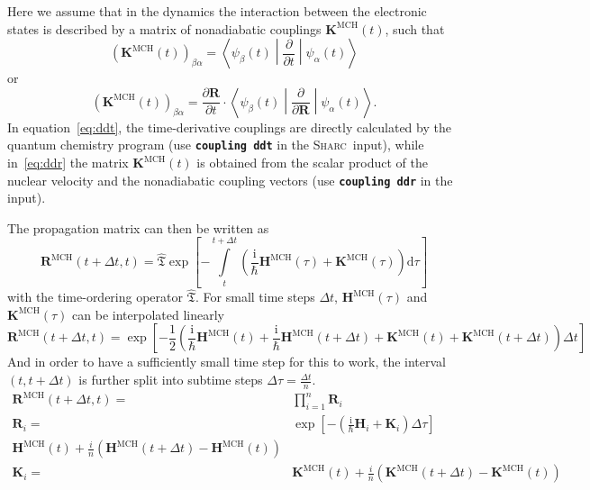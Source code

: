 \documentclass[a4paper,10pt,DIV=15,openany]{scrbook}
\newcommand{\sharc}{\textsc{Sharc}}
\newcommand{\ttt}[1]{\textbf{\texttt{#1}}}
\newcommand{\I}{\ensuremath{\mathrm{i}}}
\newcommand{\D}{\ensuremath{\mathrm{d}}}
\newcommand{\VEC}[1]{\ensuremath{\mathbf{#1}}}
\begin{document}
Here we assume that in the dynamics the interaction between the electronic states is described by a matrix of nonadiabatic couplings $\VEC{K}^{\text{MCH}}(t)$, such that
\begin{equation}
  \left(\VEC{K}^{\text{MCH}}(t)\right)_{\beta\alpha}
  =
  \left\langle
    \psi_\beta(t)
  \middle|
    \frac{\partial}{\partial t}
  \middle|
    \psi_\alpha(t)
  \right\rangle
  \label{eq:ddt}
\end{equation}
or
\begin{equation}
  \left(\VEC{K}^{\text{MCH}}(t)\right)_{\beta\alpha}
  =
  \frac{\partial \VEC{R}}{\partial t}\cdot
  \left\langle
    \psi_\beta(t)
  \middle|
    \frac{\partial}{\partial \VEC{R}}
  \middle|
    \psi_\alpha(t)
  \right\rangle.
  \label{eq:ddr}
\end{equation}
In equation~\eqref{eq:ddt}, the time-derivative couplings are directly calculated by the quantum chemistry program (use \ttt{coupling ddt} in the \sharc\ input), while in~\eqref{eq:ddr} the matrix $\VEC{K}^{\text{MCH}}(t)$ is obtained from the scalar product of the nuclear velocity and the nonadiabatic coupling vectors (use \ttt{coupling ddr} in the input).

The propagation matrix can then be written as 
\begin{equation}
  \VEC{R}^{\text{MCH}}(t+\Delta t,t)=
  \hat{\mathfrak{T}}
  \exp\left[
    -\int\limits_{t}^{t+\Delta t}
    \left(
      \frac{\I}{\hbar}\VEC{H}^{\text{MCH}}(\tau)+\VEC{K}^{\text{MCH}}(\tau) 
    \right)\D\tau
  \right]
\end{equation}
with the time-ordering operator $\hat{\mathfrak{T}}$. For small time steps $\Delta t$, $\VEC{H}^{\text{MCH}}(\tau)$ and $\VEC{K}^{\text{MCH}}(\tau)$ can be interpolated linearly
\begin{equation}
  \VEC{R}^{\text{MCH}}(t+\Delta t,t)=
  \exp\left[
    -\frac{1}{2}\left(
      \frac{\I}{\hbar}\VEC{H}^{\text{MCH}}(t)+\frac{\I}{\hbar}\VEC{H}^{\text{MCH}}(t+\Delta t)
      +\VEC{K}^{\text{MCH}}(t)+\VEC{K}^{\text{MCH}}(t+\Delta t)
    \right)\Delta t
  \right]
\end{equation}
And in order to have a sufficiently small time step for this to work, the interval $(t,t+\Delta t)$ is further split into subtime steps $\Delta\tau=\frac{\Delta t}{n}$. 
\begin{align}
  \VEC{R}^{\text{MCH}}(t+\Delta t,t)=&
  \prod\limits_{i=1}^{n}
  \VEC{R}_i\\
  \VEC{R}_i=&
  \exp\left[
      -\left(
        \frac{\I}{\hbar}\VEC{H}_i
        +\VEC{K}_i
      \right)\Delta\tau
  \right]\\
  \VEC{H}^{\text{MCH}}(t) + \frac{i}{n}
  \left(
    \VEC{H}^{\text{MCH}}(t+\Delta t)-\VEC{H}^{\text{MCH}}(t)
  \right)\label{eq:ham_propn}\\
  \VEC{K}_i=&
  \VEC{K}^{\text{MCH}}(t) + \frac{i}{n}
  \left(
    \VEC{K}^{\text{MCH}}(t+\Delta t)-\VEC{K}^{\text{MCH}}(t)
  \right)
\end{align}
\end{document}
